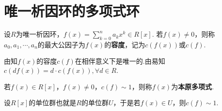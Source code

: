 \documentclass[../../main.tex]{subfiles}%
\begin{document}
\section{唯一析因环的多项式环}

\begin{definition}[容度]
设$R$为唯一析因环，$f(x)=\sum\limits_{k=0}^n a_kx^k \in R[x]$. 若$f(x) \neq 0$，则称$a_0, a_1, \cdots, a_n$的最大公因子为$f(x)$的\textbf{容度}，记为$c(f(x))$或$c(f)$.
\end{definition}
\begin{remark}
由知$f(x)$的容度$c(f)$在相伴意义下是唯一的.由易知$c(df(x))=d\cdot c(f(x)),\forall d\in R.$
\end{remark}

\begin{definition}[本原多项式]
若$f(x) \in R[x]$，$f(x) \neq 0$，$c(f) \sim 1$，则称$f(x)$为\textbf{本原多项式}.
\end{definition}
\begin{remark}
设$R[x]$的单位群也就是$R$的单位群$U$，于是若$f(x) \in U$，则$c(f) \sim 1$.
\end{remark}
\end{document}
